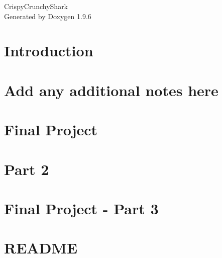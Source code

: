 \documentclass[twoside]{book}
\newcommand{\+}{\discretionary{\mbox{\scriptsize$\hookleftarrow$}}{}{}}
\newcommand{\clearemptydoublepage}{%
    \newpage{\pagestyle{empty}\cleardoublepage}%
  }
\begin{document}
  \raggedbottom
    \hypersetup{pageanchor=false,
                bookmarksnumbered=true,
                pdfencoding=unicode
               }
  \begin{titlepage}
  \vspace*{7cm}
  \begin{center}%
  {\Large Crispy\+Crunchy\+Shark}\\
  \vspace*{1cm}
  {\large Generated by Doxygen 1.9.6}\\
  \end{center}
  \end{titlepage}
  \clearemptydoublepage
  \tableofcontents
  \clearemptydoublepage
  \hypersetup{pageanchor=true}
\chapter{Introduction}
\label{md__engine__g_u_i__r_e_a_d_m_e}

\chapter{Add any additional notes here}
\label{md__engine__r_e_a_d_m_e}

\chapter{Final Project}
\label{md_part1__r_e_a_d_m_e}

\chapter{Part 2}
\label{md_part2__r_e_a_d_m_e}

\chapter{Final Project -\/ Part 3}
\label{md_part3__r_e_a_d_m_e}

\chapter{README}
\label{md__r_e_a_d_m_e}

\end{document}
